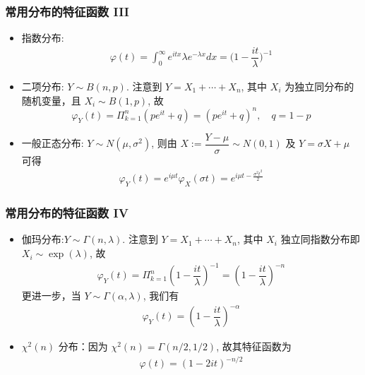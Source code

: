 \documentclass[Prob-All.tex]{subfiles}
\begin{document}
\begin{frame}%
	\frametitle{常用分布的特征函数  III}
	\begin{itemize}[<+-|alert@+>]
		\item 指数分布:
		\begin{eqnarray*}
			\varphi(t)=\int_0^\infty e^{itx}\lambda e^{-\lambda x}dx=\bigg(1-\dfrac{it}{\lambda}\bigg)^{-1}
		\end{eqnarray*}
		\item 二项分布: $Y\sim B (n,p)$. 注意到 $Y=X_1+\cdots+X_n$, 其中 $X_i$ 为独立同分布的随机变量，且 $X_i\sim B (1,p)$, 故
		\[\varphi_Y(t)=\Pi_{k=1}^n(pe^{it}+q)=(pe^{it}+q)^n, \quad q=1-p\]

		\item 一般正态分布: $Y\sim N (\mu,\sigma^2)$, 则由 $X:=\dfrac{Y-\mu}{\sigma}\sim N (0,1)$ 及 $Y=\sigma X+\mu$ 可得
		\begin{eqnarray*}
			\varphi_Y(t)=e^{i\mu t}\varphi_X(\sigma t)=e^{i\mu t-\frac{\sigma^2t^2}{2}}
		\end{eqnarray*}
	\end{itemize}
\end{frame}
\begin{frame}%
	\frametitle{常用分布的特征函数  IV}
	\begin{itemize}[<+-|alert@+>]
		\item 伽玛分布:$Y\sim \Gamma (n,\lambda)$. 注意到 $Y=X_1+\cdots+X_n$, 其中 $X_i$ 独立同指数分布即 $X_i\sim \exp (\lambda)$, 故
		\begin{eqnarray*}
			\varphi_Y(t)=\Pi_{k=1}^n(1-\dfrac{it}{\lambda})^{-1}=(1-\dfrac{it}{\lambda})^{-n}
		\end{eqnarray*}
		更进一步，当 $Y\sim \Gamma (\alpha,\lambda)$, 我们有
		\begin{eqnarray*}
			\varphi_Y(t)=(1-\dfrac{it}{\lambda})^{-\alpha}
		\end{eqnarray*}
		\item $\chi^2 (n)$ 分布：因为 $\chi^2 (n)=\Gamma (n/2,1/2)$, 故其特征函数为
		\begin{eqnarray*}
			\varphi(t)=(1-2it)^{-n/2}
		\end{eqnarray*}
	\end{itemize}
\end{frame}
\end{document}
